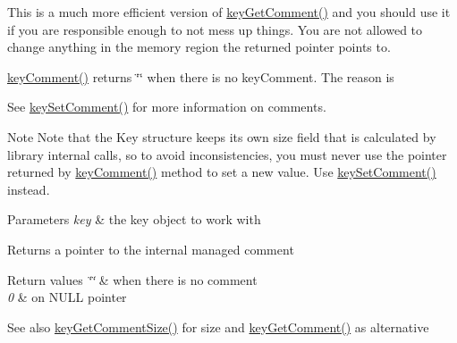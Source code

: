 This is a much more efficient version of \mbox{\hyperlink{group__meta_gafb89735689929ff717cc9f2d0d0b46a2}{key\+Get\+Comment()}} and you should use it if you are responsible enough to not mess up things. You are not allowed to change anything in the memory region the returned pointer points to.

\mbox{\hyperlink{group__meta_gac89fd319783b3457db45b4c09e55274a}{key\+Comment()}} returns \char`\"{}\char`\"{} when there is no key\+Comment. The reason is 
\begin{DoxyCode}{0}
\end{DoxyCode}


See \mbox{\hyperlink{group__meta_ga8863a877a84fa46e6017fe72e49b89c1}{key\+Set\+Comment()}} for more information on comments.

\begin{DoxyNote}{Note}
Note that the Key structure keeps its own size field that is calculated by library internal calls, so to avoid inconsistencies, you must never use the pointer returned by \mbox{\hyperlink{group__meta_gac89fd319783b3457db45b4c09e55274a}{key\+Comment()}} method to set a new value. Use \mbox{\hyperlink{group__meta_ga8863a877a84fa46e6017fe72e49b89c1}{key\+Set\+Comment()}} instead.
\end{DoxyNote}

\begin{DoxyParams}{Parameters}
{\em key} & the key object to work with \\
\hline
\end{DoxyParams}
\begin{DoxyReturn}{Returns}
a pointer to the internal managed comment 
\end{DoxyReturn}

\begin{DoxyRetVals}{Return values}
{\em \char`\"{}\char`\"{}} & when there is no comment \\
\hline
{\em 0} & on N\+U\+LL pointer \\
\hline
\end{DoxyRetVals}
\begin{DoxySeeAlso}{See also}
\mbox{\hyperlink{group__meta_ga0dd737fadc16d4cf16720d17f066a9d3}{key\+Get\+Comment\+Size()}} for size and \mbox{\hyperlink{group__meta_gafb89735689929ff717cc9f2d0d0b46a2}{key\+Get\+Comment()}} as alternative 
\end{DoxySeeAlso}
\mbox{\label{group__meta_ga6b05da399c3c78904969ef39f191b0eb}} 
